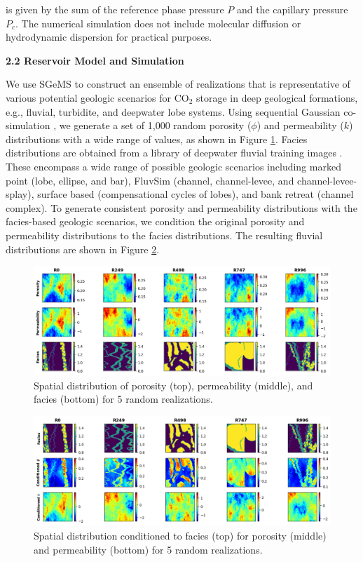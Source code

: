 \documentclass[10pt, twoside]{article}
\begin{document}
is given by the sum of the reference phase pressure $P$ and the capillary pressure $P_c$. The numerical simulation does not include molecular diffusion or hydrodynamic dispersion for practical purposes.

\textbf{2.2 Reservoir Model and Simulation} 

We use SGeMS \cite{Remy2009} to construct an ensemble of realizations that is representative of various potential geologic scenarios for CO$_2$ storage in deep geological formations, e.g., fluvial, turbidite, and deepwater lobe systems. Using sequential Gaussian co-simulation \cite{Verly1993}, we generate a set of 1,000 random porosity ($\phi$) and permeability ($k$) distributions with a wide range of values, as shown in Figure \ref{geomodels}. Facies distributions are obtained from a library of deepwater fluvial training images \cite{PYRCZ2008542, misael_m_morales_2023_7702128}. These encompass a wide range of possible geologic scenarios including marked point (lobe, ellipse, and bar), FluvSim (channel, channel-levee, and channel-levee-splay), surface based (compensational cycles of lobes), and bank retreat (channel complex). To generate consistent porosity and permeability distributions with the facies-based geologic scenarios, we condition the original porosity and permeability distributions to the facies distributions. The resulting fluvial distributions are shown in Figure \ref{conditioned_geomodels}. 

\begin{figure}[t]
    \centering
    \includegraphics[width=16cm]{figures/geomodels.png}
    \caption{Spatial distribution of porosity (top), permeability (middle), and facies (bottom) for 5 random realizations.}
    \label{geomodels}
\end{figure}

\begin{figure}[t]
    \centering
    \includegraphics[width=16cm]{figures/conditioned_geomodels.png}
    \caption{Spatial distribution conditioned to facies (top) for porosity (middle) and permeability (bottom) for 5 random realizations.}
    \label{conditioned_geomodels}
\end{figure}
\end{document}
